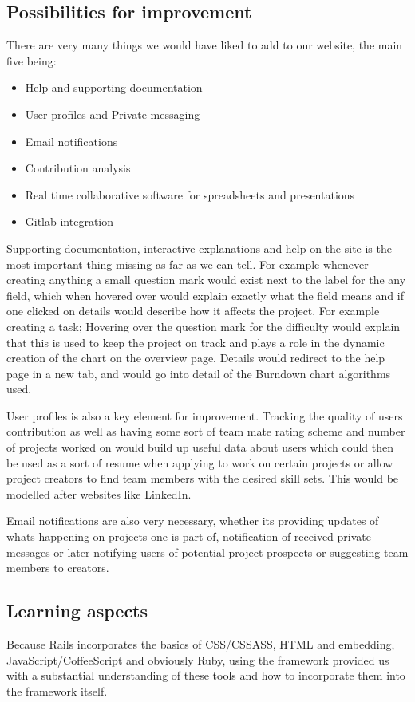 \documentclass[a4wide, 11pt]{article}
\begin{document}
\subsection{Possibilities for improvement}
There are very many things we would have liked to add to our website, the main five being:
\begin{itemize}
  \item Help and supporting documentation
  \item User profiles and Private messaging
  \item Email notifications
  \item Contribution analysis
  \item Real time collaborative software for spreadsheets and presentations
  \item Gitlab integration
\end{itemize}

Supporting documentation, interactive explanations and help on the site is the most important thing missing as far as we can tell. For example whenever creating anything a small question mark would exist next to the label for the any field, which when hovered over would explain exactly what the field means and if one clicked on details would describe how it affects the project. For example creating a task; Hovering over the question mark for the difficulty would explain that this is used to keep the project on track and plays a role in the dynamic creation of the chart on the overview page. Details would redirect to the help page in a new tab, and would go into detail of the Burndown chart algorithms used.

User profiles is also a key element for improvement. Tracking the quality of users contribution as well as having some sort of team mate rating scheme and number of projects worked on would build up useful data about users which could then be used as a sort of resume when applying to work on certain projects or allow project creators to find team members with the desired skill sets. This would be modelled after websites like LinkedIn.

Email notifications are also very necessary, whether its providing updates of whats happening on projects one is part of, notification of received private messages or later notifying users of potential project prospects or suggesting team members to creators.
 
\subsection{Learning aspects}
Because Rails incorporates the basics of CSS/CSSASS, HTML and embedding, JavaScript/CoffeeScript and obviously Ruby, using the framework provided us with a substantial understanding of these tools and how to incorporate them into the framework itself. 
\end{document}
